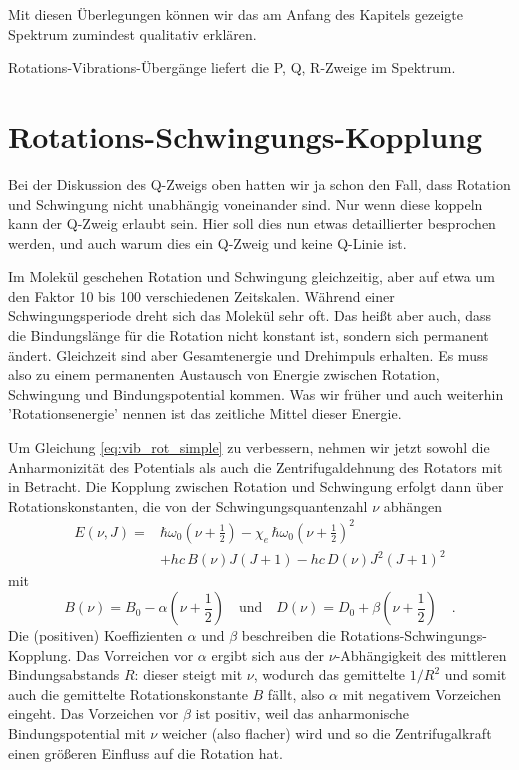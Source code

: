 Mit diesen Überlegungen können wir das am Anfang des Kapitels gezeigte Spektrum zumindest qualitativ erklären.


\begin{marginfigure}
\caption{Rotations-Vibrations-Übergänge liefert die P, Q, R-Zweige im Spektrum.}
\end{marginfigure}
 
 
\section{Rotations-Schwingungs-Kopplung}

Bei der Diskussion des Q-Zweigs oben hatten wir ja schon den Fall, dass Rotation und Schwingung nicht unabhängig voneinander sind. Nur wenn diese koppeln kann der Q-Zweig erlaubt sein. Hier soll dies nun etwas detaillierter besprochen werden, und auch warum dies ein Q-Zweig und keine Q-Linie ist.

Im Molekül geschehen Rotation und Schwingung gleichzeitig, aber auf etwa um den Faktor 10 bis 100 verschiedenen Zeitskalen. Während einer Schwingungsperiode dreht sich das Molekül sehr oft. Das heißt aber auch, dass die Bindungslänge für die Rotation nicht konstant ist, sondern sich permanent ändert. Gleichzeit sind aber Gesamtenergie und Drehimpuls erhalten. Es muss also zu einem permanenten Austausch von Energie zwischen Rotation, Schwingung und Bindungspotential kommen. Was wir früher und auch weiterhin 'Rotationsenergie' nennen ist das zeitliche Mittel dieser Energie.

Um Gleichung \ref{eq:vib_rot_simple} zu verbessern, nehmen wir jetzt sowohl die Anharmonizität des Potentials als auch die Zentrifugaldehnung des Rotators mit in Betracht. Die Kopplung zwischen Rotation und Schwingung erfolgt dann über Rotationskonstanten, die von der Schwingungsquantenzahl $\nu$ abhängen
\begin{align}
 E(\nu, J) = & \hbar \omega_0 \left( \nu  + \frac{1}{2} \right)
 - \chi_e \, \hbar \omega_0  \left( \nu  + \frac{1}{2} \right)^2 \\
 & + h c \, B(\nu) J (J+1) - h c \, D(\nu) J^2 (J+1)^2  \nonumber
\end{align}
mit
\begin{equation}
B(\nu) = B_0 - \alpha \left(\nu + \frac{1}{2} \right) \quad \text{und} \quad
D(\nu) = D_0 + \beta \left(\nu + \frac{1}{2} \right)  \quad .
\end{equation}
Die (positiven) Koeffizienten $\alpha$ und $\beta$ beschreiben die  Rotations-Schwingungs-Kopplung. Das Vorreichen vor $\alpha$ ergibt sich aus der $\nu$-Abhängigkeit des mittleren Bindungsabstands $R$: dieser steigt mit $\nu$, wodurch das gemittelte $1/R^2$ und somit auch die gemittelte Rotationskonstante $B$ fällt, also $\alpha$ mit negativem Vorzeichen eingeht. Das Vorzeichen vor $\beta$ ist positiv, weil das anharmonische Bindungspotential mit $\nu$ weicher (also flacher) wird und so die Zentrifugalkraft einen größeren Einfluss auf die Rotation hat.


